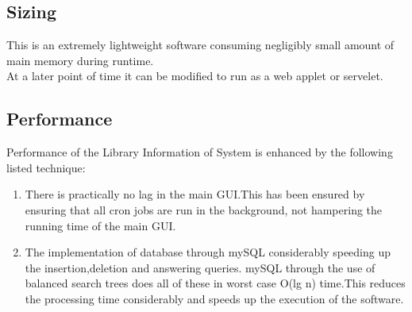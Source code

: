 \documentclass[a4paper]{article}
\begin{document}
\subsection{Sizing}
This is an extremely lightweight software consuming negligibly small amount of main memory during runtime.\\ 
At a later point of time it can be modified to run as a web applet or servelet. 

\subsection{Performance}
Performance of the Library Information of System is enhanced by the following listed technique:
\begin{enumerate}
\item There is practically no lag in the main GUI.This has been ensured by 
ensuring that all cron jobs are run in the background, not hampering the running time of the main GUI.
\item The implementation of database through mySQL considerably speeding up the insertion,deletion and answering queries. mySQL through the use of balanced search trees does all of these in worst case O(lg n) time.This reduces the processing time considerably and speeds up the execution of the software. 

\end{enumerate}
\end{document}

